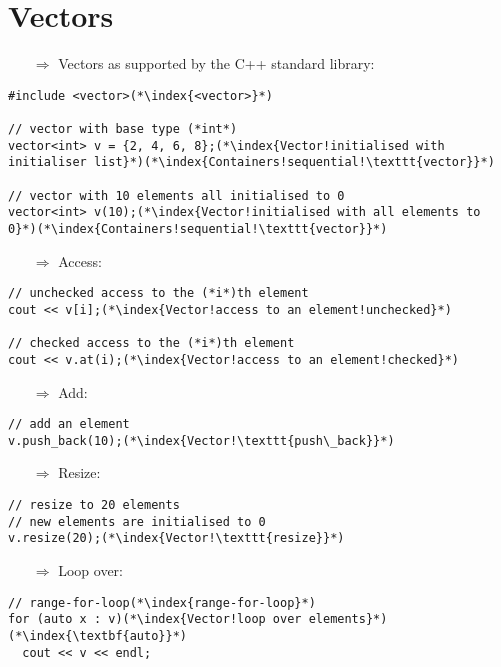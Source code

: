 \documentclass[10pt]{article}
\begin{document}
\section{Vectors}
\small
\begin{enumerate}
\item[$\Rightarrow$] Vectors as supported by the C++ standard library:
\end{enumerate}
\begin{lstlisting}
#include <vector>(*\index{<vector>}*)

// vector with base type (*int*)
vector<int> v = {2, 4, 6, 8};(*\index{Vector!initialised with initialiser list}*)(*\index{Containers!sequential!\texttt{vector}}*)

// vector with 10 elements all initialised to 0
vector<int> v(10);(*\index{Vector!initialised with all elements to 0}*)(*\index{Containers!sequential!\texttt{vector}}*)
\end{lstlisting}
\begin{enumerate}
\item[$\Rightarrow$] Access:
\end{enumerate}
\begin{lstlisting}
// unchecked access to the (*i*)th element
cout << v[i];(*\index{Vector!access to an element!unchecked}*)

// checked access to the (*i*)th element
cout << v.at(i);(*\index{Vector!access to an element!checked}*)
\end{lstlisting}
\begin{enumerate}
\item[$\Rightarrow$] Add:
\end{enumerate}
\begin{lstlisting}
// add an element
v.push_back(10);(*\index{Vector!\texttt{push\_back}}*)
\end{lstlisting}
\begin{enumerate}
\item[$\Rightarrow$] Resize:
\end{enumerate}
\begin{lstlisting}
// resize to 20 elements
// new elements are initialised to 0
v.resize(20);(*\index{Vector!\texttt{resize}}*)
\end{lstlisting}
\begin{enumerate}
\item[$\Rightarrow$] Loop over:
\end{enumerate}
\begin{lstlisting}
// range-for-loop(*\index{range-for-loop}*)
for (auto x : v)(*\index{Vector!loop over elements}*)(*\index{\textbf{auto}}*)
  cout << v << endl;\end{lstlisting}
\end{document}

